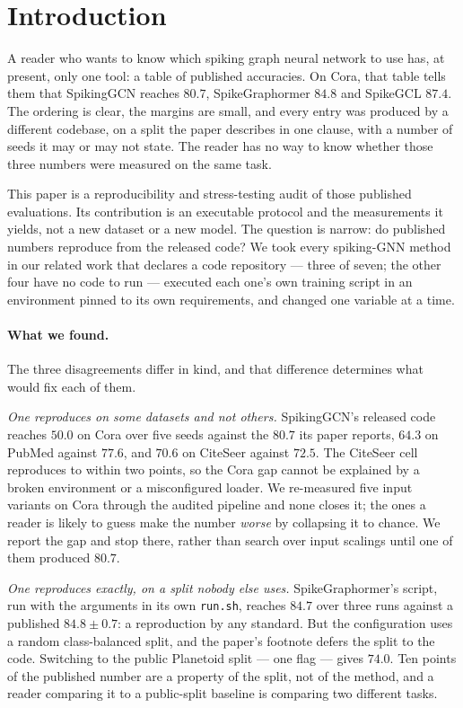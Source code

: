 \section{Introduction}
\label{sec:intro}

A reader who wants to know which spiking graph neural network to use has, at present, only one tool:
a table of published accuracies. On Cora, that table tells them that SpikingGCN reaches $80.7$,
SpikeGraphormer $84.8$ and SpikeGCL $87.4$. The ordering is clear, the margins are small, and every
entry was produced by a different codebase, on a split the paper describes in one clause, with a
number of seeds it may or may not state. The reader has no way to know whether those three numbers
were measured on the same task.

This paper is a reproducibility and stress-testing audit of those published evaluations. Its
contribution is an executable protocol and the measurements it yields, not a new dataset or a new
model. The question is narrow: do published numbers reproduce from the released code? We took every
spiking-GNN method in our related work that declares a code repository --- three of seven; the other
four have no code to run --- executed each one's own training script in an environment pinned to its
own requirements, and changed one variable at a time.

\paragraph{What we found.} The three disagreements differ in kind, and that difference determines
what would fix each of them.

\emph{One reproduces on some datasets and not others.} SpikingGCN's released code reaches $50.0$ on
Cora over five seeds against the $80.7$ its paper reports, $64.3$ on PubMed against $77.6$, and
$70.6$ on CiteSeer against $72.5$. The CiteSeer cell reproduces to within two points, so the Cora
gap cannot be explained by a broken environment or a misconfigured loader. We re-measured five input
variants on Cora through the audited pipeline and none closes it; the ones a reader is likely to
guess make the number \emph{worse} by collapsing it to chance. We report the gap and
stop there, rather than search over input scalings until one of them produced $80.7$.

\emph{One reproduces exactly, on a split nobody else uses.} SpikeGraphormer's script, run with the
arguments in its own \texttt{run.sh}, reaches $84.7$ over three runs against a published
$84.8 \pm 0.7$: a reproduction by any standard. But the configuration uses a random class-balanced
split, and the paper's footnote defers the split to the code. Switching to the public Planetoid split
--- one flag --- gives $74.0$. Ten points of the published number are a property of the split, not of
the method, and a reader comparing it to a public-split baseline is comparing two different tasks.

